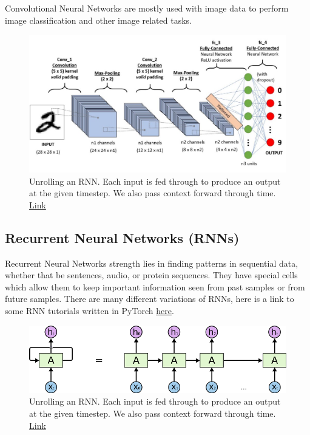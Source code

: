 \documentclass{article}
\begin{document}
Convolutional Neural Networks are mostly used with image data to perform image classification and other image related tasks.

\begin{figure}[H]
    \centering
    \includegraphics[width=4.5in]{cnn.jpeg}
    \caption{Unrolling an RNN. Each input is fed through to produce an output at the given timestep. We also pass context forward through time. \href{https://towardsdatascience.com/a-comprehensive-guide-to-convolutional-neural-networks-the-eli5-way-3bd2b1164a53}{Link}}
    \label{fig:rnn}
\end{figure}

\subsection{Recurrent Neural Networks (RNNs)} 

Recurrent Neural Networks strength lies in finding patterns in sequential data, whether that be sentences, audio, or protein sequences. They have special cells which allow them to keep important information seen from past samples or from future samples. There are many different variations of RNNs, here is a link to some RNN tutorials written in PyTorch \href{https://github.com/yunjey/pytorch-tutorial/tree/master/tutorials/02-intermediate}{here}.

\begin{figure}[H]
    \centering
    \includegraphics[width=4.5in]{rnn.png}
    \caption{Unrolling an RNN. Each input is fed through to produce an output at the given timestep. We also pass context forward through time. \href{https://medium.com/@jianqiangma/all-about-recurrent-neural-networks-9e5ae2936f6e}{Link}}
    \label{fig:rnn}
\end{figure}
\end{document}
